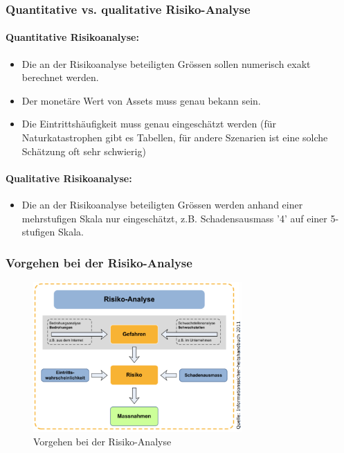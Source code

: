 \documentclass[10pt,a4paper]{article}
\begin{document}
\subsubsection*{Quantitative vs. qualitative Risiko-Analyse}
\paragraph*{Quantitative Risikoanalyse:}
\begin{itemize}[noitemsep,topsep=0pt,leftmargin=*]
    \item Die an der Risikoanalyse beteiligten Grössen sollen numerisch exakt berechnet werden.
    \item Der monetäre Wert von Assets muss genau bekann sein.
    \item Die Eintrittshäufigkeit muss genau eingeschätzt werden (für Naturkatastrophen gibt es Tabellen, für andere Szenarien ist eine solche Schätzung oft sehr schwierig)
\end{itemize}

\paragraph*{Qualitative Risikoanalyse:}
\begin{itemize}[noitemsep,topsep=0pt,leftmargin=*]
    \item Die an der Risikoanalyse beteiligten Grössen werden anhand einer mehrstufigen Skala nur eingeschätzt, z.B. Schadensausmass '4' auf einer 5-stufigen Skala.
\end{itemize}

\subsubsection*{Vorgehen bei der Risiko-Analyse}
\begin{figure}[H]
    \begin{center}
    \includegraphics[width=8cm]{images/Risikoanalyse_Vorgehen.png}
    \caption{Vorgehen bei der Risiko-Analyse}
    \label{Risiko-Analyse Vorgehen}
    \end{center}
\end{figure}
\end{document}
